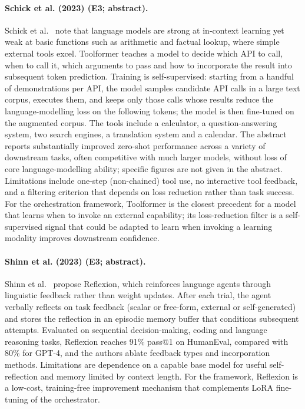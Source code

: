 \documentclass[10pt,a4paper]{article}
\begin{document}
\paragraph{Schick et al. (2023) (E3; abstract).} Schick et al.~\cite{Schick2023} note that language models are strong at in-context learning yet weak at basic functions such as arithmetic and factual lookup, where simple external tools excel. Toolformer teaches a model to decide which API to call, when to call it, which arguments to pass and how to incorporate the result into subsequent token prediction. Training is self-supervised: starting from a handful of demonstrations per API, the model samples candidate API calls in a large text corpus, executes them, and keeps only those calls whose results reduce the language-modelling loss on the following tokens; the model is then fine-tuned on the augmented corpus. The tools include a calculator, a question-answering system, two search engines, a translation system and a calendar. The abstract reports substantially improved zero-shot performance across a variety of downstream tasks, often competitive with much larger models, without loss of core language-modelling ability; specific figures are not given in the abstract. Limitations include one-step (non-chained) tool use, no interactive tool feedback, and a filtering criterion that depends on loss reduction rather than task success. For the orchestration framework, Toolformer is the closest precedent for a model that learns when to invoke an external capability; its loss-reduction filter is a self-supervised signal that could be adapted to learn when invoking a learning modality improves downstream confidence.

\paragraph{Shinn et al. (2023) (E3; abstract).} Shinn et al.~\cite{Shinn2023} propose Reflexion, which reinforces language agents through linguistic feedback rather than weight updates. After each trial, the agent verbally reflects on task feedback (scalar or free-form, external or self-generated) and stores the reflection in an episodic memory buffer that conditions subsequent attempts. Evaluated on sequential decision-making, coding and language reasoning tasks, Reflexion reaches 91\% pass@1 on HumanEval, compared with 80\% for GPT-4, and the authors ablate feedback types and incorporation methods. Limitations are dependence on a capable base model for useful self-reflection and memory limited by context length. For the framework, Reflexion is a low-cost, training-free improvement mechanism that complements LoRA fine-tuning of the orchestrator.
\end{document}
